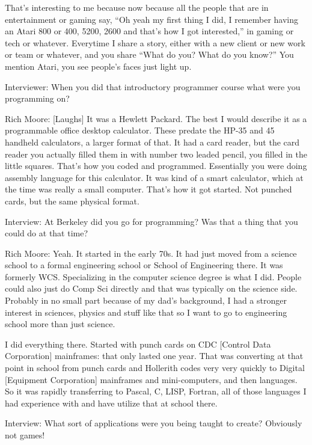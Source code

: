 That's interesting to me because now because all the people that are in entertainment or gaming say, “Oh yeah my first thing I did, I remember having an Atari 800 or 400, 5200, 2600 and that’s how I got interested,” in gaming or tech or whatever. Everytime I share a story, either with a new client or new work or team or whatever, and you share “What do you? What do you know?” You mention Atari, you see people’s faces just light up.

\textcolor{interviewer}{Interviewer:} When you did that introductory programmer course what were you programming on?

\textcolor{interviewee}{Rich Moore:} [Laughs] It was a Hewlett Packard. The best I would describe it as a programmable office desktop calculator. These predate the HP-35 and 45 handheld calculators, a larger format of that. It had a card reader, but the card reader you actually filled them in with number two leaded pencil, you filled in the little squares. That’s how you coded and programmed. Essentially you were doing assembly language for this calculator. It was kind of a smart calculator, which at the time was really a small computer. That’s how it got started. Not punched cards, but the same physical format.

Interview: At Berkeley did you go for programming? Was that a thing that you could do at that time?

\textcolor{interviewee}{Rich Moore:} Yeah. It started in the early 70s. It had just moved from a science school to a formal engineering school or School of Engineering there. It was formerly WCS. Specializing in the computer science degree is what I did. People could also just do Comp Sci directly and that was typically on the science side. Probably in no small part because of my dad's background, I had a stronger interest in sciences, physics and stuff like that so I want to go to engineering school more than just science.

I did everything there. Started with punch cards on CDC [Control Data Corporation] mainframes: that only lasted one year. That was converting at that point in school from punch cards and Hollerith codes very very quickly to Digital [Equipment Corporation] mainframes and mini-computers, and then languages. So it was rapidly transferring to Pascal, C, LISP, Fortran, all of those languages I had experience with and have utilize that at school there.

Interview: What sort of applications were you being taught to create? Obviously not games!


